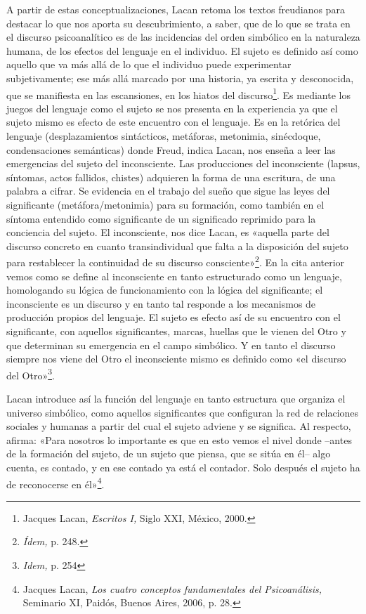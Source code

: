 A partir de estas conceptualizaciones, Lacan retoma los textos freudianos para destacar lo que nos aporta su descubrimiento, a saber, que de lo que se trata en el discurso psicoanalítico es de las incidencias del orden simbólico en la naturaleza humana, de los efectos del lenguaje en el individuo. El sujeto es definido así como aquello que va más allá de lo que el individuo puede experimentar subjetivamente; ese más allá marcado por una historia, ya escrita y desconocida, que se manifiesta en las escansiones, en los hiatos del discurso\footnote{Jacques Lacan, \emph{Escritos I,} Siglo XXI, México, 2000.}. Es mediante los juegos del lenguaje como el sujeto se nos presenta en la experiencia ya que el sujeto mismo es efecto de este encuentro con el lenguaje. Es en la retórica del lenguaje (desplazamientos sintácticos, metáforas, metonimia, sinécdoque, condensaciones semánticas) donde Freud, indica Lacan, nos enseña a leer las emergencias del sujeto del inconsciente. Las producciones del inconsciente (lapsus, síntomas, actos fallidos, chistes) adquieren la forma de una escritura, de una palabra a cifrar. Se evidencia en el trabajo del sueño que sigue las leyes del significante (metáfora/metonimia) para su formación, como también en el síntoma entendido como significante de un significado reprimido para la conciencia del sujeto. El inconsciente, nos dice Lacan, es «aquella parte del discurso concreto en cuanto transindividual que falta a la disposición del sujeto para restablecer la continuidad de su discurso consciente»\footnote{\emph{Ídem,} p. 248.}. En la cita anterior vemos como se define al inconsciente en tanto estructurado como un lenguaje, homologando su lógica de funcionamiento con la lógica del significante; el inconsciente es un discurso y en tanto tal responde a los mecanismos de producción propios del lenguaje. El sujeto es efecto así de su encuentro con el significante, con aquellos significantes, marcas, huellas que le vienen del Otro y que determinan su emergencia en el campo simbólico. Y en tanto el discurso siempre nos viene del Otro el inconsciente mismo es definido como «el discurso del Otro»\footnote{\emph{Idem,} p. 254}.

Lacan introduce así la función del lenguaje en tanto estructura que organiza el universo simbólico, como aquellos significantes que configuran la red de relaciones sociales y humanas a partir del cual el sujeto adviene y se significa. Al respecto, afirma: «Para nosotros lo importante es que en esto vemos el nivel donde --antes de la formación del sujeto, de un sujeto que piensa, que se sitúa en él-- algo cuenta, es contado, y en ese contado ya está el contador. Solo después el sujeto ha de reconocerse en él»\footnote{Jacques Lacan, \emph{Los cuatro conceptos fundamentales del Psicoanálisis,} Seminario XI, Paidós, Buenos Aires, 2006, p. 28.}.

